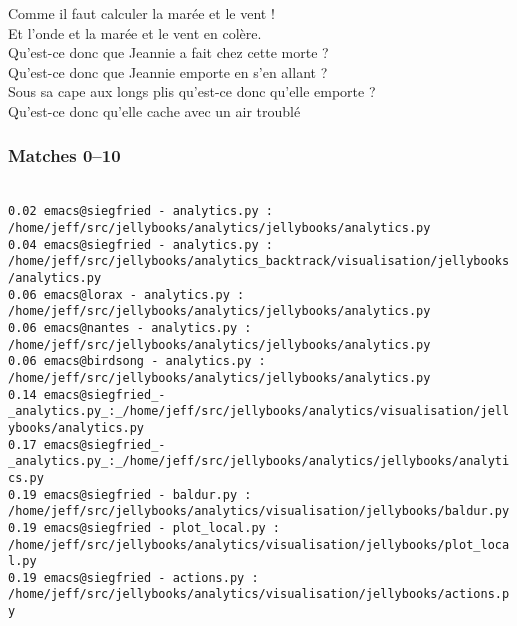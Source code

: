 \begin{frame}[t]
{   Comme il faut calculer la marée et le vent !\\
   Et l'onde et la marée et le vent en colère.\\[5mm]

   Qu'est-ce donc que Jeannie a fait chez cette morte ?\\
   Qu'est-ce donc que Jeannie emporte en s'en allant ?\\[5mm]

   Sous sa cape aux longs plis qu'est-ce donc qu'elle emporte ?\\
   Qu'est-ce donc qu'elle cache avec un air troublé
  }
\end{frame}

\begin{frame}
\frametitle{Matches 0--10}
\tt\tiny
{}\\[2mm]
\hspace{2mm}0.02 emacs@siegfried - analytics.py : /home/jeff/src/jellybooks/analytics/jellybooks/analytics.py\\
\hspace{2mm}0.04 emacs@siegfried - analytics.py : /home/jeff/src/jellybooks/analytics\_backtrack/visualisation/jellybooks/analytics.py\\
\hspace{2mm}0.06 emacs@lorax - analytics.py : /home/jeff/src/jellybooks/analytics/jellybooks/analytics.py\\
\hspace{2mm}0.06 emacs@nantes - analytics.py : /home/jeff/src/jellybooks/analytics/jellybooks/analytics.py\\
\hspace{2mm}0.06 emacs@birdsong - analytics.py : /home/jeff/src/jellybooks/analytics/jellybooks/analytics.py\\
\hspace{2mm}0.14 emacs@siegfried\_-\_analytics.py\_:\_/home/jeff/src/jellybooks/analytics/visualisation/jellybooks/analytics.py\\
\hspace{2mm}0.17 emacs@siegfried\_-\_analytics.py\_:\_/home/jeff/src/jellybooks/analytics/jellybooks/analytics.py\\
\hspace{2mm}0.19 emacs@siegfried - baldur.py : /home/jeff/src/jellybooks/analytics/visualisation/jellybooks/baldur.py\\
\hspace{2mm}0.19 emacs@siegfried - plot\_local.py : /home/jeff/src/jellybooks/analytics/visualisation/jellybooks/plot\_local.py\\
\hspace{2mm}0.19 emacs@siegfried - actions.py : /home/jeff/src/jellybooks/analytics/visualisation/jellybooks/actions.py
\end{frame}

